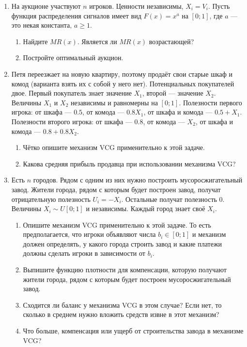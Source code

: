 \begin{enumerate}

\item На аукционе участвуют $ n $ игроков. Ценности независимы, $ X_{i}=V_{i}$. Пусть функция распределения сигналов имеет вид $ F(x)=x^{a} $ на $ [0;1] $, где $ a $ — это некая константа, $ a\geq 1 $.
\begin{enumerate}
\item Найдите $ MR(x) $. Является ли $ MR(x) $ возрастающей?
\item Постройте оптимальный аукцион. 
\end{enumerate}

\item Петя переезжает на новую квартиру, поэтому продаёт свои старые шкаф и комод (варианта взять их с собой у него нет).  Потенциальных покупателей двое. Первый покупатель знает значение $ X_{1} $, второй — значение $ X_{2} $. Величины  $ X_{1} $ и  $ X_{2} $ независимы и равномерны на $ [0;1] $. Полезности первого игрока: от шкафа — $ 0.5 $, от комода — $ 0.8X_{1} $, от шкафа и комода — $ 0.5+X_{1} $. Полезности второго игрока: от шкафа — $ 0.8 $, от комода — $ X_{2} $, от шкафа и комода — $ 0.8+0.8X_{2}$. 
\begin{enumerate}
\item Чётко опишите механизм VCG применительно к этой задаче.
\item Какова средняя прибыль продавца при использовании механизма VCG?
\end{enumerate}

\item Есть $ n $ городов. Рядом с одним из них нужно построить мусоросжигательный завод. Жители города, рядом с которым будет построен завод, получат отрицательную полезность $ U_{i}=-X_{i} $. Остальные получат полезность 0. Величины $ X_{i}\sim U[0;1] $ и независимы. Каждый город знает своё $ X_{i} $.
\begin{enumerate}
\item Опишите механизм VCG применительно к этой задаче. То есть предполагается, что игроки объявляют числа $ b_{i}\in [0;1] $ и механизм должен определять, у какого города строить завод и какие платежи должны сделать игроки в зависимости от $ b_{i} $.
\item Выпишите функцию плотности для компенсации, которую получают жители города, рядом с которым будет построен мусоросжигательный завод.
\item Сходится ли баланс у механизма VCG в этом случае? Если нет, то сколько в среднем нужно вложить средств извне в этот механизм?
\item Что больше, компенсация или ущерб от строительства завода в механизме VCG?
\end{enumerate}



\end{enumerate}
